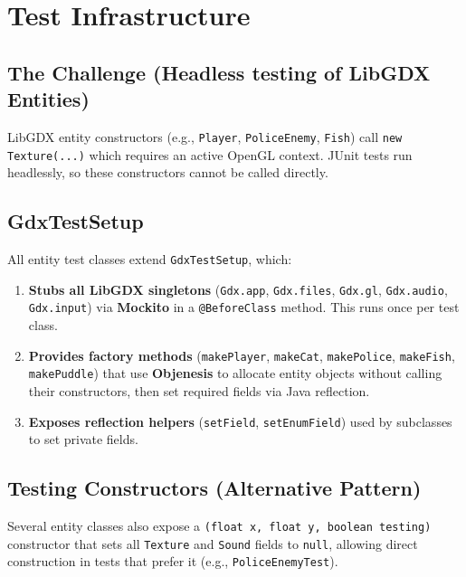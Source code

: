 \documentclass[12pt]{article}
\begin{document}
\section{Test Infrastructure}
\label{sec:infrastructure}

\subsection{The Challenge (Headless testing of LibGDX Entities)}

LibGDX entity constructors (e.g., \texttt{Player}, \texttt{PoliceEnemy}, \texttt{Fish}) call \texttt{new Texture(...)} which requires an active OpenGL context. JUnit tests run headlessly, so these constructors cannot be called directly.

\subsection{GdxTestSetup}

All entity test classes extend \texttt{GdxTestSetup}, which:

\begin{enumerate}[itemsep=2pt]
  \item \textbf{Stubs all LibGDX singletons} (\texttt{Gdx.app}, \texttt{Gdx.files}, \texttt{Gdx.gl}, \texttt{Gdx.audio}, \texttt{Gdx.input}) via \textbf{Mockito} in a \texttt{@BeforeClass} method. This runs once per test class.
  \item \textbf{Provides factory methods} (\texttt{makePlayer}, \texttt{makeCat}, \texttt{makePolice}, \texttt{makeFish}, \texttt{makePuddle}) that use \textbf{Objenesis} to allocate entity objects without calling their constructors, then set required fields via Java reflection.
  \item \textbf{Exposes reflection helpers} (\texttt{setField}, \texttt{setEnumField}) used by subclasses to set private fields.
\end{enumerate}

\subsection{Testing Constructors (Alternative Pattern)}

Several entity classes also expose a \texttt{(float x, float y, boolean testing)} constructor that sets all \texttt{Texture} and \texttt{Sound} fields to \texttt{null}, allowing direct construction in tests that prefer it (e.g., \texttt{PoliceEnemyTest}).
\end{document}

